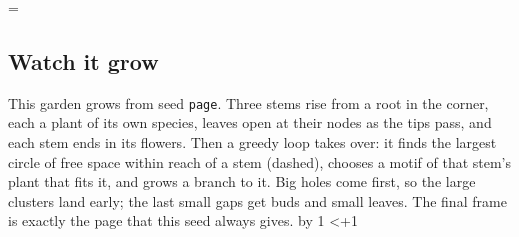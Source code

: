 \documentclass[11pt,a4paper]{article}
\begin{document}
\animk=\animfrom\relax
\loop
  \setcounter{page}{1}\setcounter{section}{3}\setcounter{subsection}{2}
  \florilegiumframe[\animexplain]{\the\animk}{\animframes}
  \subsection{Watch it grow}

  This garden grows from seed \texttt{\ifx\florilegiumseed\empty page\else\florilegiumseed\fi}.
  Three stems rise from a root in the corner, each a plant of its own species, leaves open
  at their nodes as the tips pass, and each stem ends in its flowers. Then a greedy loop
  takes over: it finds the largest circle of free space within reach of a stem\ifx\animexplain\empty\else{} (dashed)\fi,
  chooses a motif of that stem's plant that fits it, and grows a branch to it. Big holes
  come first, so the large clusters land early; the last small gaps get buds and small
  leaves. The final frame is exactly the page that this seed always gives.
  \florilegiumtextend
  \clearpage
  \advance\animk by 1
\ifnum\animk<\numexpr\animto+1\relax\repeat
\end{document}
